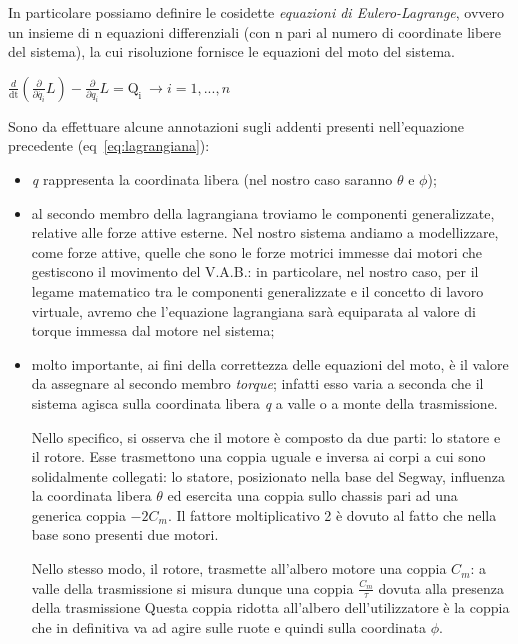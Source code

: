 In particolare possiamo definire le cosidette \textit{equazioni di Eulero-Lagrange}, ovvero un insieme di n equazioni differenziali (con n pari al numero di coordinate libere del sistema), la cui risoluzione fornisce le equazioni del moto del sistema.
\begin{center}
	\label{eq:lagrangiana}
	$\frac{d}{\mathrm{dt}}\left(\frac{\partial }{\partial \dot{q_i} }L\right)-\frac{\partial }{\partial q_i}L=\mathrm{Q_i}\ \rightarrow i = 1,...,n$
\end{center}

Sono da effettuare alcune annotazioni sugli addenti presenti nell'equazione precedente  (eq~\ref{eq:lagrangiana}):
\begin{itemize}
	\item \textit{q} rappresenta la coordinata libera (nel nostro caso saranno $\theta$ e $\phi$);
	\item al secondo membro della lagrangiana troviamo le componenti generalizzate, relative alle forze attive esterne. Nel nostro sistema andiamo a modellizzare, come forze attive, quelle che sono le forze motrici immesse dai motori che gestiscono il movimento del V.A.B.: in particolare, nel nostro caso, per il legame matematico tra le componenti generalizzate e il concetto di lavoro virtuale, avremo che l'equazione lagrangiana sarà equiparata al valore di torque immessa dal motore nel sistema;
	\item molto importante, ai fini della correttezza delle equazioni del moto, è il valore da assegnare al secondo membro \textit{torque}; infatti esso varia a seconda che il sistema agisca sulla coordinata libera \textit{q} a valle o a monte della trasmissione.
	
	Nello specifico, si osserva che il motore è composto da due parti: lo statore e il rotore. Esse trasmettono una coppia uguale e inversa ai corpi a cui sono solidalmente collegati: lo statore, posizionato nella base del Segway, influenza la coordinata libera $\theta$ ed esercita una coppia sullo chassis pari ad una generica coppia \textit{$-2 C_m$}.
	Il fattore moltiplicativo 2 è dovuto al fatto che nella base sono presenti due motori.
	
	Nello stesso modo, il rotore, trasmette all'albero motore una coppia \textit{$C_m$}: a valle della trasmissione si misura dunque una coppia \textit{$\frac{C_m}{\tau}$} dovuta alla presenza della trasmissione
	Questa coppia ridotta all'albero dell'utilizzatore è la coppia che in definitiva va ad agire sulle ruote e quindi sulla coordinata $\phi$.
\end{itemize}

